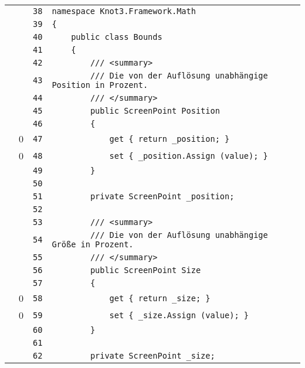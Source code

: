 \documentclass[a4paper,10pt]{article}
\begin{document}
\begin{longtable}[l]{lrrl}
\cellcolor{gray} &  & \verb~38~ & \verb~namespace Knot3.Framework.Math~\\
\cellcolor{gray} &  & \verb~39~ & \verb~{~\\
\cellcolor{gray} &  & \verb~40~ & \verb~    public class Bounds~\\
\cellcolor{gray} &  & \verb~41~ & \verb~    {~\\
\cellcolor{gray} &  & \verb~42~ & \verb~        /// <summary>~\\
\cellcolor{gray} &  & \verb~43~ & \verb~        /// Die von der Auflösung unabhängige Position in Prozent.~\\
\cellcolor{gray} &  & \verb~44~ & \verb~        /// </summary>~\\
\cellcolor{gray} &  & \verb~45~ & \verb~        public ScreenPoint Position~\\
\cellcolor{gray} &  & \verb~46~ & \verb~        {~\\
\cellcolor{red} & 0 & \verb~47~ & \verb~            get { return _position; }~\\
\cellcolor{red} & 0 & \verb~48~ & \verb~            set { _position.Assign (value); }~\\
\cellcolor{gray} &  & \verb~49~ & \verb~        }~\\
\cellcolor{gray} &  & \verb~50~ & \verb~~\\
\cellcolor{gray} &  & \verb~51~ & \verb~        private ScreenPoint _position;~\\
\cellcolor{gray} &  & \verb~52~ & \verb~~\\
\cellcolor{gray} &  & \verb~53~ & \verb~        /// <summary>~\\
\cellcolor{gray} &  & \verb~54~ & \verb~        /// Die von der Auflösung unabhängige Größe in Prozent.~\\
\cellcolor{gray} &  & \verb~55~ & \verb~        /// </summary>~\\
\cellcolor{gray} &  & \verb~56~ & \verb~        public ScreenPoint Size~\\
\cellcolor{gray} &  & \verb~57~ & \verb~        {~\\
\cellcolor{red} & 0 & \verb~58~ & \verb~            get { return _size; }~\\
\cellcolor{red} & 0 & \verb~59~ & \verb~            set { _size.Assign (value); }~\\
\cellcolor{gray} &  & \verb~60~ & \verb~        }~\\
\cellcolor{gray} &  & \verb~61~ & \verb~~\\
\cellcolor{gray} &  & \verb~62~ & \verb~        private ScreenPoint _size;~\\

\end{longtable}
\end{document}
